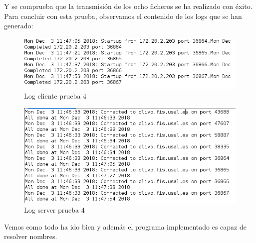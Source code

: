 \documentclass[journal, a4paper]{IEEEtran}
\begin{document}
Y se comprueba que la transmisión de los ocho ficheros se ha realizado con éxito. Para concluir con esta prueba, observamos el contenido de los logs que se han generado:

\begin{figure}[H]
\centering
\includegraphics[scale=0.55]{images/log_server_prueba_4}
\caption{Log cliente prueba 4}
\end{figure}

\begin{figure}[H]
\centering
\includegraphics[scale=0.40]{images/log_cliente_prueba_4}
\caption{Log server prueba 4}
\end{figure}

Vemos como todo ha ido bien y además el programa implementado es capaz de resolver nombres.


\end{document}
